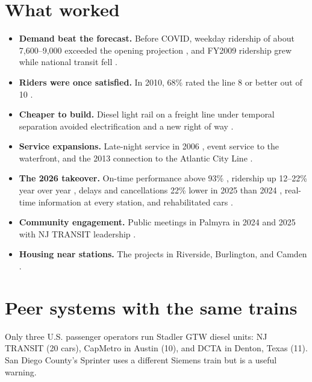 \documentclass[11pt]{article}
\begin{document}
\section{What worked}\label{sec:worked}
\begin{itemize}
\item \textbf{Demand beat the forecast.} Before COVID, weekday ridership of about 7{,}600--9{,}000 exceeded the opening projection \citep{njt2008ridership,reason2004}, and FY2009 ridership grew while national transit fell \citep{tstc2011}.
\item \textbf{Riders were once satisfied.} In 2010, 68\% rated the line 8 or better out of 10 \citep{dvrpc2013}.
\item \textbf{Cheaper to build.} Diesel light rail on a freight line under temporal separation avoided electrification and a new right of way \citep{fr1999waiver}.
\item \textbf{Service expansions.} Late-night service in 2006 \citep{njt2006latenight}, event service to the waterfront, and the 2013 connection to the Atlantic City Line \citep{inquirer2013pennsauken}.
\item \textbf{The 2026 takeover.} On-time performance above 93\% \citep{ols2027njt}, ridership up 12--22\% year over year \citep{ntd_monthly}, delays and cancellations 22\% lower in 2025 than 2024 \citep{centraljersey2025}, real-time information at every station, and rehabilitated cars \citep{njt2026rehab}.
\item \textbf{Community engagement.} Public meetings in Palmyra in 2024 and 2025 with NJ TRANSIT leadership \citep{cbs2024meeting,centraljersey2025}.
\item \textbf{Housing near stations.} The projects in Riverside, Burlington, and Camden \citep{njtod2026}.
\end{itemize}

\section{Peer systems with the same trains}\label{sec:peers}
Only three U.S. passenger operators run Stadler GTW diesel units: NJ TRANSIT (20 cars), CapMetro in Austin (10), and DCTA in Denton, Texas (11). San Diego County's Sprinter uses a different Siemens train but is a useful warning.
\end{document}
